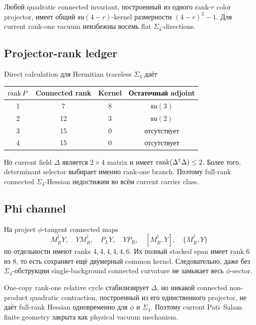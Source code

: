 \begin{theorem}
Любой quadratic connected invariant, построенный из одного rank-\(r\)
color projector, имеет общий
\(\mathfrak{su}(4-r)\)-kernel размерности
\((4-r)^2-1\). Для current rank-one vacuum неизбежны восемь flat
\(\Sigma_4\)-directions.
\end{theorem}

\subsection{Projector-rank ledger}

Direct calculation для Hermitian traceless \(\Sigma_4\) даёт
\begin{center}
\begin{tabular}{cccc}
\toprule
\(\operatorname{rank} P\) & Connected rank & Kernel & Остаточный adjoint\\
\midrule
1 & 7 & 8 & \(\mathfrak{su}(3)\)\\
2 & 12 & 3 & \(\mathfrak{su}(2)\)\\
3 & 15 & 0 & отсутствует\\
4 & 15 & 0 & отсутствует\\
\bottomrule
\end{tabular}
\end{center}
Но current field \(\Delta\) является \(2\times4\) matrix и имеет
\(\operatorname{rank}(\Delta^\dagger\Delta)\le2\). Более того, determinant selector
выбирает именно rank-one branch. Поэтому full-rank connected
\(\Sigma_4\)-Hessian недостижим во всём current carrier class.

\subsection{Phi channel}

На project \(\phi\)-tangent connected maps
\begin{equation}
 M_R^\dagger Y,\quad
 YM_R^\dagger,\quad
 P_LY,\quad
 YP_R,\quad
 [M_R^\dagger,Y],\quad
 \{M_R^\dagger,Y\}
\end{equation}
по отдельности имеют ranks \(4,4,4,4,4,6\). Их полный stacked span имеет
rank \(6\) из \(8\), то есть сохраняет ещё двумерный common kernel.
Следовательно, даже без \(\Sigma_4\)-обструкции single-background
connected curvature не замыкает весь \(\phi\)-sector.

\begin{theorem}
One-copy rank-one relative cycle стабилизирует \(\Delta\), но никакой
connected non-product quadratic contraction, построенный из его
единственного projector, не даёт full-rank Hessian одновременно для
\(\phi\) и \(\Sigma_4\). Поэтому current Pati--Salam finite geometry
закрыта как physical vacuum mechanism.
\end{theorem}

